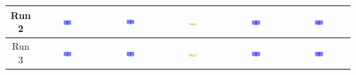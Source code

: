 \begin{table}[H]
\begin{tabular}{|c|c|c|c|c|c|}
    \hline
    Run 2 & \includegraphics[width=0.15\textwidth]{./run_2/png/gpt-4o_results/BasicLayout.png} & \includegraphics[width=0.15\textwidth]{./run_2/png/claude-3-5-sonnet-20240620_results/BasicLayout.png} & \includegraphics[width=0.15\textwidth]{./run_2/png/watsonx_meta-llama_llama-3-1-70b-instruct_results/BasicLayout.png} & \includegraphics[width=0.15\textwidth]{./run_2/png/watsonx_meta-llama_llama-3-405b-instruct_results/BasicLayout.png} & \includegraphics[width=0.15\textwidth]{./run_2/png/o1-preview_results/BasicLayout.png} \\
    \hline
    Run 3 & \includegraphics[width=0.15\textwidth]{./run_3/png/gpt-4o_results/BasicLayout.png} & \includegraphics[width=0.15\textwidth]{./run_3/png/claude-3-5-sonnet-20240620_results/BasicLayout.png} & \includegraphics[width=0.15\textwidth]{./run_3/png/watsonx_meta-llama_llama-3-1-70b-instruct_results/BasicLayout.png} & \includegraphics[width=0.15\textwidth]{./run_3/png/watsonx_meta-llama_llama-3-405b-instruct_results/BasicLayout.png} & \includegraphics[width=0.15\textwidth]{./run_3/png/o1-preview_results/BasicLayout.png} \\

\end{tabular}
\end{table}

